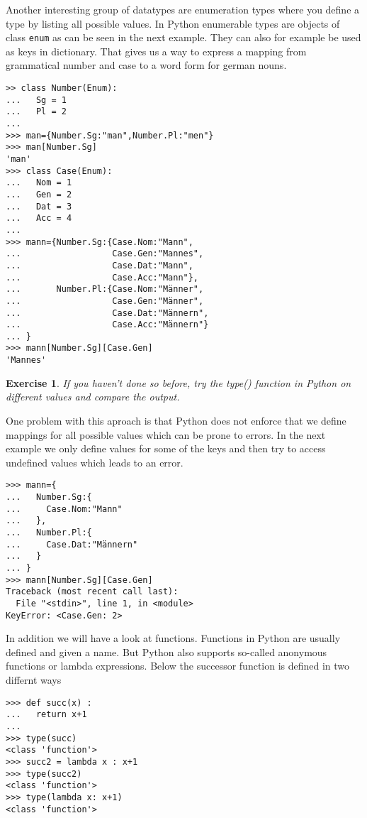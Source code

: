 \documentclass{scrartcl}
\newtheorem{exercise}{Exercise}
\begin{document}
Another interesting group of datatypes are enumeration types where you define a type by listing all possible values. In Python enumerable types are objects of class \texttt{enum} as can be seen in the next example. They can also for example be used as keys in dictionary. That gives us a way to express a mapping from grammatical number and case to a word form for german nouns.

\begin{verbatim}
>> class Number(Enum):
...   Sg = 1
...   Pl = 2
... 
>>> man={Number.Sg:"man",Number.Pl:"men"}
>>> man[Number.Sg]
'man'
>>> class Case(Enum):
...   Nom = 1
...   Gen = 2
...   Dat = 3
...   Acc = 4
... 
>>> mann={Number.Sg:{Case.Nom:"Mann", 
...                  Case.Gen:"Mannes", 
...                  Case.Dat:"Mann", 
...                  Case.Acc:"Mann"},
...       Number.Pl:{Case.Nom:"Männer", 
...                  Case.Gen:"Männer", 
...                  Case.Dat:"Männern", 
...                  Case.Acc:"Männern"}
... }
>>> mann[Number.Sg][Case.Gen]
'Mannes'
\end{verbatim}

\begin{exercise}
  If you haven't done so before, try the type() function in Python on different values and compare the output. 
\end{exercise}
One problem with this aproach is that Python does not enforce that we define mappings for all possible values which can be prone to errors. In the next example we only define values for some of the keys and then try to access undefined values which leads to an error.

\begin{verbatim}
>>> mann={
...   Number.Sg:{
...     Case.Nom:"Mann"
...   },
...   Number.Pl:{
...     Case.Dat:"Männern"
...   }
... }
>>> mann[Number.Sg][Case.Gen]
Traceback (most recent call last):
  File "<stdin>", line 1, in <module>
KeyError: <Case.Gen: 2>
\end{verbatim}

In addition we will have a look at functions. Functions in Python are usually defined and given a name. But Python also supports so-called
anonymous functions or lambda expressions. Below the successor function is defined in two differnt ways
\begin{verbatim}
>>> def succ(x) :
...   return x+1
... 
>>> type(succ)
<class 'function'>
>>> succ2 = lambda x : x+1
>>> type(succ2)
<class 'function'>
>>> type(lambda x: x+1)
<class 'function'>
\end{verbatim}
\end{document}
